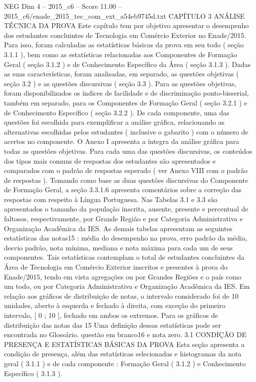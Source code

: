 \begin{textsample}{NEG Dim 4 – 2015\_c6 – Score 11.00 – 2015\_c6/enade\_2015\_tec\_com\_ext\_a54eb9745d.txt}  \label{ex:f4_neg_330}
CAPÍTULO 3 ANÁLISE TÉCNICA DA PROVA Este capítulo tem por objetivo apresentar o desempenho dos estudantes concluintes de Tecnologia em Comércio Exterior no Enade/2015.
Para isso, foram calculadas as estatísticas básicas da prova em seu todo ( seção 3.1.1 ), bem como as estatísticas relacionadas aos Componentes de Formação Geral ( seção 3.1.2 ) e de Conhecimento Específico da Área ( seção 3.1.3 ).
Dadas as suas características, foram analisadas, em separado, as questões objetivas ( seção 3.2 ) e as questões discursivas ( seção 3.3 ).
Para as questões objetivas, foram disponibilizados os índices de facilidade e de discriminação ponto-bisserial, também em separado, para os Componentes de Formação Geral ( seção 3.2.1 ) e de Conhecimento Específico ( seção 3.2.2 ).
De cada componente, uma das questões foi escolhida para exemplificar a análise gráfica, relacionando as alternativas escolhidas pelos estudantes ( inclusive o gabarito ) com o número de acertos no componente.
O Anexo I apresenta a íntegra da análise gráfica para todas as questões objetivas.
Para cada uma das questões discursivas, os conteúdos dos tipos mais comuns de respostas dos estudantes são apresentados e comparados com o padrão de respostas esperado ( ver Anexo VIII com o padrão de respostas ).
Tomando como base as duas questões discursivas do Componente de Formação Geral, a seção 3.3.1.6 apresenta comentários sobre a correção das respostas com respeito à Língua Portuguesa.
Nas Tabelas 3.1 e 3.3 são apresentados o tamanho da população inscrita, ausente, presente e percentual de faltosos, respectivamente, por Grande Região e por Categoria Administrativa e Organização Acadêmica da IES.
As demais tabelas apresentam as seguintes estatísticas das notas15 : média do desempenho na prova, erro padrão da média, desvio padrão, nota mínima, mediana e nota máxima para cada um de seus componentes.
Tais estatísticas contemplam o total de estudantes concluintes da Área de Tecnologia em Comércio Exterior inscritos e presentes à prova do Enade/2015, tendo em vista agregações ou por Grandes Regiões e o país como um todo, ou por Categoria Administrativa e Organização Acadêmica da IES.
Em relação aos gráficos de distribuição de notas, o intervalo considerado foi de 10 unidades, aberto à esquerda e fechado à direita, com exceção do primeiro intervalo, [ 0 ; 10 ], fechado em ambos os extremos.
Para os gráficos de distribuição das notas das 15 Uma definição dessas estatísticas pode ser encontrada no Glossário. questão em branco16 e nota zero. 3.1 CONDIÇÃO DE PRESENÇA E ESTATÍSTICAS BÁSICAS DA PROVA Esta seção apresenta a condição de presença, além das estatísticas selecionadas e histogramas da nota geral ( 3.1.1 ) e de cada componente : Formação Geral ( 3.1.2 ) e Conhecimento Específico ( 3.1.3 ).

\end{textsample}

